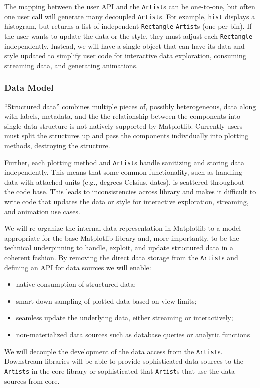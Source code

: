 \documentclass[11pt]{article}  %
\begin{document}
The mapping between the user API and the \texttt{Artist}s can be
one-to-one, but often one user call will generate many decoupled
\texttt{Artist}s.  For example, \texttt{hist} displays a histogram, but
returns a list of independent \texttt{Rectangle} \texttt{Artist}s (one
per bin).  If the user wants to update the data or the style, they
must adjust each \texttt{Rectangle} independently.  Instead, we will
have a single object that can have its data and style updated to
simplify user code for interactive data exploration, consuming
streaming data, and generating animations.


\subsubsection{Data Model}
\label{sec:dm}

``Structured data'' combines multiple pieces of, possibly
heterogeneous, data along with labels, metadata, and the the
relationship between the components into single data structure is
not natively supported by Matplotlib.
 Currently users must split the structures up and pass the
components individually into
plotting methods, destroying the structure.


Further, each plotting method and \texttt{Artist}s handle sanitizing
and storing data independently.  This means that some common
functionality, such as handling data with attached units (e.g.,
degrees Celsius, dates), is scattered throughout the code base.  This
leads to inconsistencies across library and makes it difficult to
write code that updates the data or style for interactive exploration,
streaming, and animation use cases.


We will re-organize the internal data representation in Matplotlib to
a model appropriate for the base Matplotlib library and, more
importantly, to be the technical underpinning to handle, exploit, and
update structured data in a coherent fashion.
By removing the direct data storage from
the \texttt{Artist}s and defining an API for data sources we will enable:
\begin{itemize}[noitemsep]
  \item native consumption of structured data;
  \item smart down sampling of plotted data based on view limits;
  \item seamless update the underlying data, either
    streaming or interactively;
  \item non-materialized data sources such as database queries or analytic functions
\end{itemize}
We will decouple the development of the data access from the
\texttt{Artist}s.  Downstream libraries will be able to provide
sophisticated data sources to the \texttt{Artists} in the core library
or sophisticated that \texttt{Artist}s that use the data sources from
core.
\end{document}
